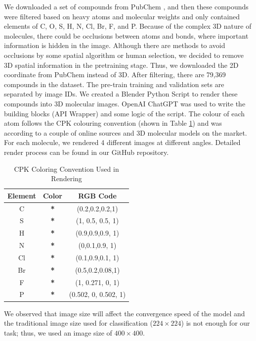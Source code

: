 \documentclass[12pt]{article}
\begin{document}
We downloaded a set of compounds from PubChem \autocite{kim_pubchem_2023}, and then these compounds were filtered based on heavy atoms and molecular weights and only contained elements of C, O, S, H, N, Cl, Br, F, and P. Because of the complex 3D nature of molecules, there could be occlusions between atoms and bonds, where important information is hidden in the image. Although there are methods to avoid occlusions by some spatial algorithm or human selection, we decided to remove 3D spatial information in the pretraining stage. Thus, we downloaded the 2D coordinate from PubChem instead of 3D.  
After filtering, there are 79,369 compounds in the dataset. The pre-train training and validation sets are separated by image IDs. We created a Blender Python Script to render these compounds into 3D molecular images. OpenAI ChatGPT was used to write the building blocks (API Wrapper) and some logic of the script. The colour of each atom follows the CPK colouring convention (shown in Table \ref{cpk}) and was according to a couple of online sources and 3D molecular models on the market. For each molecule, we rendered 4 different images at different angles. Detailed render process can be found in our GitHub repository. 
\begin{table}[]
    \centering
    \begin{tabular}{c|c|c}
        Element & Color & RGB Code \\ \hline
C & \textcolor{color0}{\textbf{*}} & (0.2,0.2,0.2,1)\\
S & \textcolor{color2}{\textbf{*}} & (1, 0.5, 0.5, 1)\\
H & \textcolor{color3}{\textbf{*}} & (0.9,0.9,0.9, 1)\\
N & \textcolor{color4}{\textbf{*}} & (0,0.1,0.9, 1)\\
Cl &  \textcolor{color5}{\textbf{*}} & (0.1,0.9,0.1, 1)\\
Br & \textcolor{color6}{\textbf{*}} & (0.5,0.2,0.08,1)\\
F & \textcolor{color7}{\textbf{*}} & (1, 0.271, 0, 1)\\
P & \textcolor{color8}{\textbf{*}} & (0.502, 0, 0.502, 1)\\
    \end{tabular}
    \caption{CPK Coloring Convention Used in Rendering}
    \label{cpk}
\end{table}
We observed that image size will affect the convergence speed of the model and the traditional image size used for classification ($224\times224$) is not enough for our task; thus, we used an image size of $400\times400$. 
\end{document}
